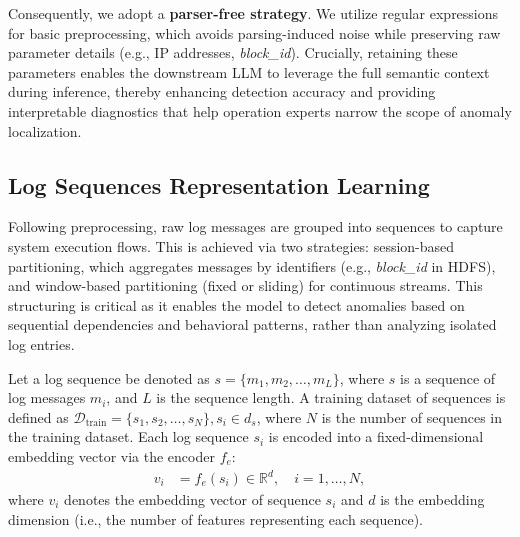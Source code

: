 \documentclass[lettersize,journal]{IEEEtran}
\begin{document}
Consequently, we adopt a \textbf{parser-free strategy}. We utilize regular expressions for basic preprocessing, which avoids parsing-induced noise while preserving raw parameter details (e.g., IP addresses, \textit{block\_id}). Crucially, retaining these parameters enables the downstream LLM to leverage the full semantic context during inference, thereby enhancing detection accuracy and providing interpretable diagnostics that help operation experts narrow the scope of anomaly localization.


\subsection{Log Sequences Representation Learning}

Following preprocessing, raw log messages are grouped into sequences to capture system execution flows. This is achieved via two strategies: session-based partitioning, which aggregates messages by identifiers (e.g., \textit{block\_id} in HDFS), and window-based partitioning (fixed or sliding) for continuous streams. This structuring is critical as it enables the model to detect anomalies based on sequential dependencies and behavioral patterns, rather than analyzing isolated log entries.

Let a log sequence be denoted as $s=\{ m_1, m_2, \dots, m_L \}$, where $s$ is a sequence of log messages $m_i$, and $L$ is the sequence length. A training dataset of sequences is defined as $\mathcal{D}_{\text{train}} = \{ s_1, s_2, \dots, s_N \}, s_i \in d_s$, where $N$ is the number of sequences in the training dataset. Each log sequence $s_i$ is encoded into a fixed-dimensional embedding vector via the encoder $f_{e}$:
\begin{equation}
\begin{aligned}
v_i &= f_e(s_i) \in \mathbb{R}^d, \quad i = 1, \dots, N,
\end{aligned}
\label{eq:sentencebert}
\end{equation}
where $v_i$ denotes the embedding vector of sequence $s_i$ and $d$ is the embedding dimension (i.e., the number of features representing each sequence).
\end{document}
